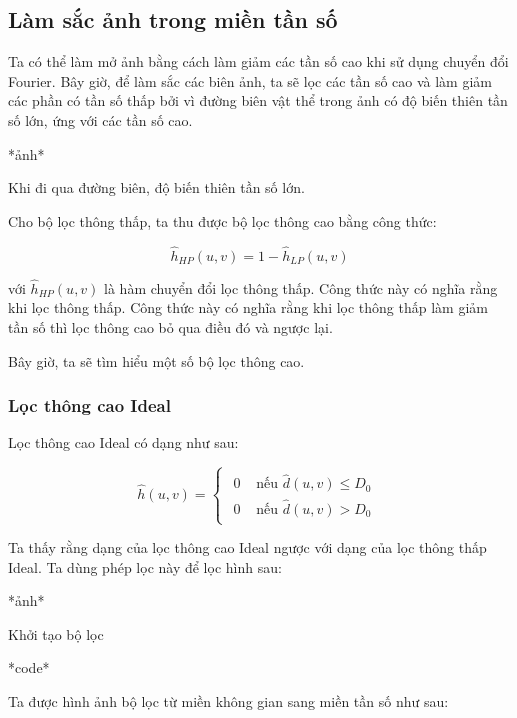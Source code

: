 \documentclass[12pt,a4paper]{report}
\numberwithin{equation}{section}
\theoremstyle{definition} %
\begin{document}
\subsection{Làm sắc ảnh trong miền tần số}

Ta có thể làm mở ảnh bằng cách làm giảm các tần số cao khi sử dụng chuyển đổi Fourier. Bây giờ, để làm sắc các biên ảnh, ta sẽ lọc các tần số cao và làm giảm các phần có tần số thấp bởi vì đường biên vật thể trong ảnh có độ biến thiên tần số lớn, ứng với các tần số cao.

*ảnh*

Khi đi qua đường biên, độ biến thiên tần số lớn.

Cho bộ lọc thông thấp, ta thu được bộ lọc thông cao bằng công thức:

\begin{equation}
    \hat{h}_{HP}(u,v) = 1 - \hat{h}_{LP}(u,v)
\end{equation}

với $\hat{h}_{HP}(u,v)$ là hàm chuyển đổi lọc thông thấp. Công thức này có nghĩa rằng khi lọc thông thấp. Công thức này có nghĩa rằng khi lọc thông thấp làm giảm tần số thì lọc thông cao bỏ qua điều đó và ngược lại.

Bây giờ, ta sẽ tìm hiểu một số bộ lọc thông cao.

\subsubsection{Lọc thông cao Ideal}

Lọc thông cao Ideal có dạng như sau:

\begin{equation}
    \hat{h}(u,v)=\begin{cases}
    \begin{aligned}
        0& \text{ nếu }  \hat{d}(u,v) \le D_0\\
        0& \text{ nếu }  \hat{d}(u,v) > D_0
    \end{aligned}
\end{cases}
\end{equation}


Ta thấy rằng dạng của lọc thông cao Ideal ngược với dạng của lọc thông thấp Ideal. Ta dùng phép lọc này để lọc hình sau: 

*ảnh*

Khởi tạo bộ lọc 

*code*

Ta được hình ảnh bộ lọc từ miền không gian sang miền tần số như sau:
\end{document}
